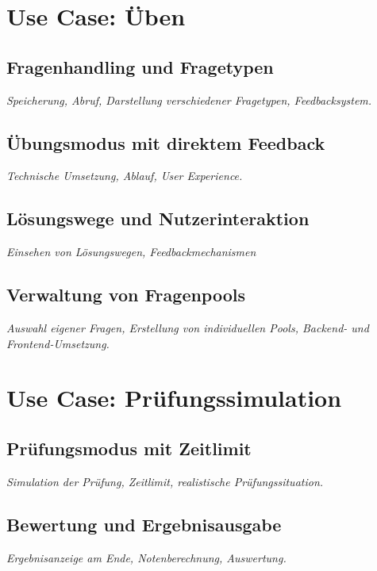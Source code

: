 \documentclass[12pt,a4paper,titlepage,listof=totoc,bibliography=totoc,chapteratlists=0pt]{scrreprt}
\begin{document}
\begin{spacing}{1}
\section{Use Case: Üben}

\subsection{Fragenhandling und Fragetypen}
\setauthor{\firstauthor}
\textit{Speicherung, Abruf, Darstellung verschiedener Fragetypen, Feedbacksystem.}

\subsection{Übungsmodus mit direktem Feedback}
\setauthor{\firstauthor}
\textit{Technische Umsetzung, Ablauf, User Experience.}

\subsection{Lösungswege und Nutzerinteraktion}
\setauthor{\secondauthor}
\textit{Einsehen von Lösungswegen, Feedbackmechanismen}

\subsection{Verwaltung von Fragenpools}
\setauthor{\secondauthor}
\textit{Auswahl eigener Fragen, Erstellung von individuellen Pools, Backend- und Frontend-Umsetzung.}

\section{Use Case: Prüfungssimulation}

\subsection{Prüfungsmodus mit Zeitlimit}
\setauthor{\firstauthor}
\textit{Simulation der Prüfung, Zeitlimit, realistische Prüfungssituation.}

\subsection{Bewertung und Ergebnisausgabe}
\setauthor{\firstauthor}
\textit{Ergebnisanzeige am Ende, Notenberechnung, Auswertung.}


\end{spacing}
\end{document}
